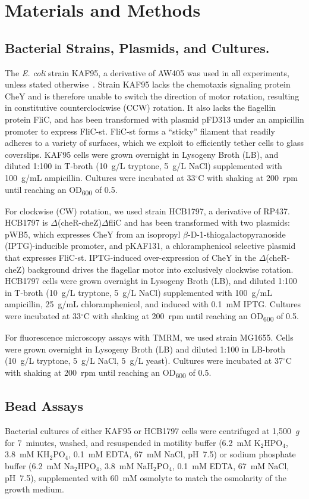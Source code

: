 \documentclass[twocolumn]{biophys-new}%
\begin{document}
\section*{Materials and Methods}
\subsection*{\textbf{Bacterial Strains, Plasmids, and Cultures.}}
The \textit{E. coli} strain KAF95, a derivative of AW405 was used in all experiments, unless stated otherwise~\cite{BERG1993}. Strain KAF95 lacks the chemotaxis signaling protein CheY and is therefore unable to switch the direction of motor rotation, resulting in constitutive counterclockwise (CCW) rotation. It also lacks the flagellin protein FliC, and has been transformed with plasmid pFD313 under an ampicillin promoter to express FliC-st. FliC-st forms a ``sticky'' filament that readily adheres to a variety of surfaces, which we exploit to efficiently tether cells to glass coverslips. KAF95 cells were grown overnight in Lysogeny Broth (LB), and diluted 1:100 in T-broth (10~g/L tryptone, 5~g/L NaCl) supplemented with 100~\textmu g/mL ampicillin. Cultures were incubated at 33$^\circ$C with shaking at 200~rpm until reaching an OD\textsubscript{600} of 0.5.

For clockwise (CW) rotation, we used strain HCB1797, a derivative of RP437. HCB1797 is  $\Delta$(cheR-cheZ)$\Delta$fliC and has been transformed with two plasmids: pWB5, which expresses CheY from an isopropyl $\beta$-D-1-thiogalactopyranoside (IPTG)-inducible promoter, and pKAF131, a  chloramphenicol selective plasmid that expresses  FliC-st. IPTG-induced over-expression of CheY in the $\Delta$(cheR-cheZ) background drives the flagellar motor into exclusively clockwise rotation. HCB1797 cells were grown overnight in Lysogeny Broth (LB), and diluted 1:100 in T-broth (10~g/L tryptone, 5~g/L NaCl) supplemented with 100~\textmu g/mL ampicillin, 25~\textmu g/mL chloramphenicol, and induced with 0.1~mM IPTG. Cultures were incubated at 33$^\circ$C with shaking at 200~rpm until reaching an OD\textsubscript{600} of 0.5.

For fluorescence microscopy assays with TMRM, we used strain MG1655. Cells were grown overnight in Lysogeny Broth (LB) and diluted 1:100 in LB-broth (10~g/L tryptone, 5~g/L NaCl, 5~g/L yeast). Cultures were incubated at 37$^\circ$C with shaking at 200~rpm until reaching an OD\textsubscript{600} of 0.5.

\subsection*{\textbf{Bead Assays}}
Bacterial cultures of either KAF95 or HCB1797 cells were centrifuged at 1,500~\textit{g} for 7~minutes, washed, and resuspended in motility buffer (6.2~mM K$_2$HPO$_4$, 3.8~mM KH$_2$PO$_4$, 0.1~mM EDTA, 67~mM NaCl, pH~7.5) or sodium phosphate buffer (6.2~mM Na$_2$HPO$_4$, 3.8~mM NaH$_2$PO$_4$, 0.1~mM EDTA, 67~mM NaCl, pH~7.5), supplemented with 60~mM osmolyte to match the osmolarity of the growth medium.
\end{document}
